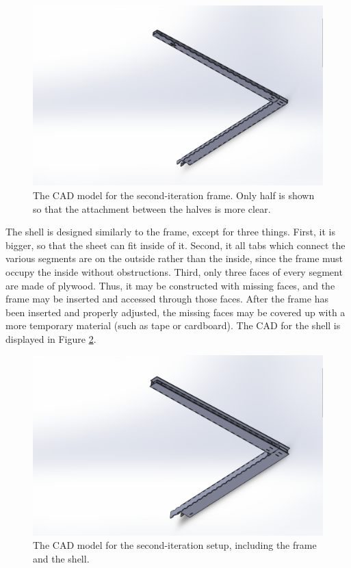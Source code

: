 \documentclass[12pt]{report} %
\begin{document}
\begin{figure}
\includegraphics[width = 0.7\linewidth]{insideCAD.png}
\centering
\caption{The CAD model for the second-iteration frame. Only half is shown so that the attachment between the halves
is more clear.}
\label{insideCAD}
\end{figure}

The shell is designed similarly to the frame, except for three things. First, it is bigger, so that the sheet can fit inside of it.
Second, it all tabs which connect the various segments are on the outside rather than the inside, since the frame must occupy the
inside without obstructions. Third, only three faces of every segment are made of plywood. Thus, it may be constructed with missing
faces, and the frame may be inserted and accessed through those faces. After the frame has been inserted and properly adjusted, the
missing faces may be covered up with a more temporary material (such as tape or cardboard). The CAD for the shell is displayed
in Figure \ref{outsideCAD}.

\begin{figure}
\includegraphics[width = 0.7\linewidth]{outsideCAD.png}
\centering
\caption{The CAD model for the second-iteration setup, including the frame and the shell.}
\label{outsideCAD}
\end{figure}
\end{document}
